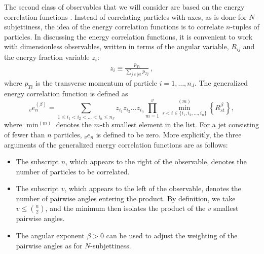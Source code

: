 The second class of observables that we will consider are based on the energy correlation functions \cite{Larkoski:2013eya,Moult:2016cvt}.
%
Instead of correlating particles with axes, as is done for $N$-subjettiness, the idea of the energy correlation functions is to correlate $n$-tuples of particles.
%
In discussing the energy correlation functions, it is convenient to
work with dimensionless observables, written in terms of the angular
variable, $R_{ij}$ and the energy fraction variable $z_i$:
\begin{align}\label{eq:SM_jetsub_2prong:ptratio}  
z_i\equiv\frac{p_{Ti}}{\sum_{j \in \text{jet}} p_{Tj}}\,,
\end{align}
where $p_{Ti}$ is the transverse momentum of particle $i=1,\dots,n_J$. 
%
%
The generalized energy correlation function is defined as
\begin{equation}\label{eq:SM_jetsub_2prong:ecf_gen}
_v e_n^{(\beta)} = \sum_{1 \leq i_1 < i_2 < \dots < i_n \leq n_J} z_{i_1} z_{i_2} \dots z_{i_n} \prod_{m = 1}^{v} \min^{(m)}_{s < t \in \{i_1, i_2 , \dots, i_n \}} \left\{ R_{st}^{\beta} \right\},
\end{equation}
where $\min^{(m)}$ denotes the $m$-th smallest element in the list.  For a jet consisting of fewer than $n$ particles, $_v e_n$ is defined to be zero.  More explicitly, the three arguments of the generalized energy correlation functions are as follows:
\begin{itemize}
\item The subscript $n$, which appears to the right of the observable, denotes the number of particles to be correlated.   
\item The subscript $v$, which appears to the left of the observable, denotes the number of pairwise angles entering the product.  By definition, we take $v \leq \binom{n}{2}$, and the minimum then isolates the product of the $v$ smallest pairwise angles.
\item The angular exponent $\beta>0$ can be used to adjust the
  weighting of the pairwise angles as for $N$-subjettiness.
\end{itemize}

